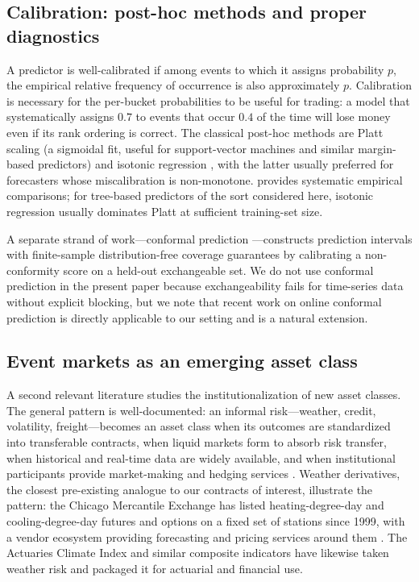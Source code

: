 \documentclass[11pt]{article}
\begin{document}
\subsection{Calibration: post-hoc methods and proper diagnostics}

A predictor is well-calibrated if among events to which it assigns
probability $p$, the empirical relative frequency of occurrence is also
approximately $p$. Calibration is necessary for the per-bucket probabilities
to be useful for trading: a model that systematically assigns $0.7$ to
events that occur $0.4$ of the time will lose money even if its rank
ordering is correct. The classical post-hoc methods are Platt scaling
\citep{platt1999probabilistic} (a sigmoidal fit, useful for support-vector
machines and similar margin-based predictors) and isotonic regression
\citep{zadrozny2002transforming}, with the latter usually preferred for
forecasters whose miscalibration is non-monotone. \citet{niculescu2005predicting}
provides systematic empirical comparisons; for tree-based predictors of the
sort considered here, isotonic regression usually dominates Platt at
sufficient training-set size.

A separate strand of work---conformal prediction
\citep{vovk2005algorithmic,angelopoulos2021gentle}---constructs prediction
intervals with finite-sample distribution-free coverage guarantees by
calibrating a non-conformity score on a held-out exchangeable set. We do
not use conformal prediction in the present paper because exchangeability
fails for time-series data without explicit blocking, but we note that
recent work on online conformal prediction is directly applicable to our
setting and is a natural extension.

\subsection{Event markets as an emerging asset class}

A second relevant literature studies the institutionalization of new
asset classes. The general pattern is well-documented: an informal
risk---weather, credit, volatility, freight---becomes an asset class
when its outcomes are standardized into transferable contracts, when
liquid markets form to absorb risk transfer, when historical and
real-time data are widely available, and when institutional participants
provide market-making and hedging services
\citep{maccheroni2009portfolio,lopez2018advances}. Weather derivatives,
the closest pre-existing analogue to our contracts of interest,
illustrate the pattern: the Chicago Mercantile Exchange has listed
heating-degree-day and cooling-degree-day futures and options on a fixed
set of stations since 1999, with a vendor ecosystem providing
forecasting and pricing services around them
\citep{hong2016probabilistic}. The Actuaries Climate Index and similar
composite indicators \citep{taillardat2016calibrated} have likewise
taken weather risk and packaged it for actuarial and financial use.
\end{document}
